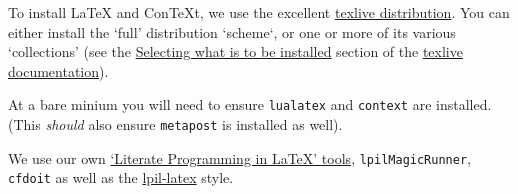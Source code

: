

To install LaTeX and ConTeXt, we use the excellent
\href{https://tug.org/texlive/}{texlive distribution}. You can either install
the `full' distribution `scheme`, or one or more of its various `collections'
(see the
\href{https://tug.org/texlive/doc/texlive-en/texlive-en.html#x1-240003.2.2}{Selecting
what is to be installed} section of the
\href{https://tug.org/texlive/doc.html}{texlive documentation}). 

At a bare minium you will need to ensure \verb|lualatex| and \verb|context| are
installed. (This \emph{should} also ensure \verb|metapost| is installed as well).

We use our own \href{https://github.com/litProgLaTeX}{`Literate Programming in
LaTeX' tools}, \verb|lpilMagicRunner|, \verb|cfdoit| as well as the
\href{}{lpil-latex} style.